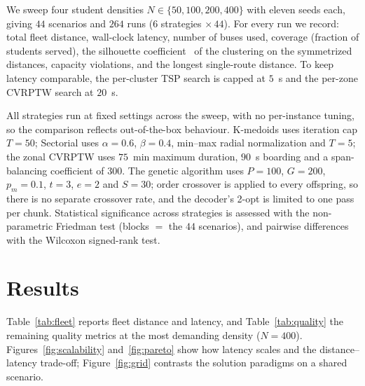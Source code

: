 \documentclass[runningheads]{llncs}
\begin{document}
We sweep four student densities $N\in\{50,100,200,400\}$ with eleven
seeds each, giving $44$ scenarios and $264$ runs ($6$ strategies
$\times\,44$). For every run we record: total fleet distance, wall-clock
latency, number of buses used, coverage (fraction of students served),
the silhouette coefficient~\cite{Rousseeuw1987Silhouettes} of the
clustering on the symmetrized distances, capacity violations, and the
longest single-route distance. To keep latency comparable, the
per-cluster TSP search is capped at $5$~s and the per-zone CVRPTW
search at $20$~s.

All strategies run at fixed settings across the sweep, with no
per-instance tuning, so the comparison reflects out-of-the-box
behaviour. K-medoids uses iteration cap $T=50$; Sectorial uses
$\alpha=0.6$, $\beta=0.4$, min--max radial normalization and $T=5$;
the zonal CVRPTW uses $75$~min maximum duration, $90$~s boarding and a
span-balancing coefficient of $300$. The genetic algorithm uses
$P=100$, $G=200$, $p_m=0.1$, $t=3$, $e=2$ and $S=30$; order crossover
is applied to every offspring, so there is no separate crossover rate,
and the decoder's 2-opt is limited to one pass per chunk.
Statistical significance across strategies is
assessed with the non-parametric Friedman test (blocks $=$ the $44$
scenarios), and pairwise differences with the Wilcoxon signed-rank
test.

\section{Results}\label{sec:results}
Table~\ref{tab:fleet} reports fleet distance and latency, and
Table~\ref{tab:quality} the remaining quality metrics at the most
demanding density ($N=400$). Figures~\ref{fig:scalability}
and~\ref{fig:pareto} show how latency scales and the distance--latency
trade-off; Figure~\ref{fig:grid} contrasts the solution paradigms on a
shared scenario.
\end{document}
